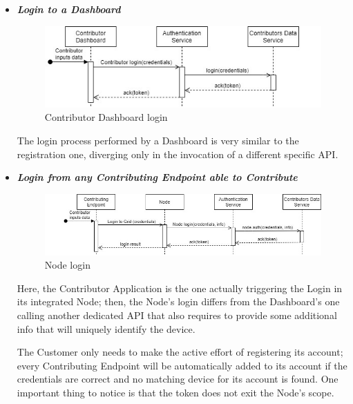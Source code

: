 \begin{itemize}
    \begin{itemize}
        \item \textbf{\textit{Login to a Dashboard}}\\
        \begin{figure}[!ht]
            \centering
            \includegraphics[scale=1]{document/chapters/chapter_5/images/use_cases_satisfaction_contributor_dashboard_login.jpg}
            \caption{Contributor Dashboard login}
            \label{fig:use_cases_satisfaction_contributor_dashboard_login}
        \end{figure}

        The login process performed by a Dashboard is very similar to the registration one, diverging only in the invocation of a different specific API.
        \vspace{4mm}

        \item \textbf{\textit{Login from any Contributing Endpoint able to Contribute}}\\
        \begin{figure}[!ht]
            \centering
            \includegraphics[scale=0.8]{document/chapters/chapter_5/images/use_cases_satisfaction_node_login.jpg}
            \caption{Node login}
            \label{fig:use_cases_satisfaction_node_login}
        \end{figure}

        Here, the Contributor Application is the one actually triggering the Login in its integrated Node; then, the Node's login differs from the Dashboard's one calling another dedicated API that also requires to provide some additional info that will uniquely identify the device.
        
        The Customer only needs to make the active effort of registering its account; every Contributing Endpoint will be automatically added to its account if the credentials are correct and no matching device for its account is found.
        One important thing to notice is that the token does not exit the Node's scope.


\end{itemize}
\end{itemize}
